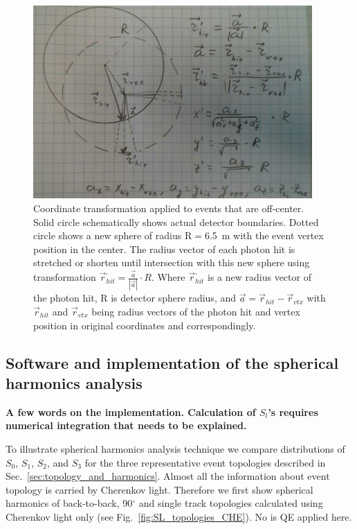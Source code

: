 \documentclass[12pt,twoside,letterpaper]{article}
\begin{document}
\begin{figure}[htb]
\centering
\includegraphics[angle=0,width=0.95\textwidth]{plots/SphH_transform_sketch.JPG}
\caption{Coordinate transformation applied to events that are off-center. Solid circle schematically shows actual detector boundaries. Dotted circle shows a new sphere of radius R$=$6.5~m with the event vertex position in the center. The radius vector of each photon hit is stretched or shorten until intersection with this new sphere using transformation $\vec{r}^{,}_{hit} = \frac{\vec{a}}{|\vec{a}|} \cdot R$. Where $\vec{r}^{,}_{hit}$ is a new radius vector of the photon hit, R is detector sphere radius, and $\vec{a}=\vec{r}_{hit} - \vec{r}_{vtx}$ with $\vec{r}_{hit}$ and $\vec{r}_{vtx}$ being radius vectors of the photon hit and vertex position in original coordinates and correspondingly.}
\label{fig:SphH_transform}
\end{figure}


\subsection{Software and implementation of the spherical harmonics analysis}
{\bf A few words on the implementation. Calculation of $S_l$'s requires numerical integration that needs to be explained.}

To illustrate spherical harmonics analysis technique we compare distributions of $S_0$, $S_1$, $S_2$, and $S_3$ for the three representative event topologies described in Sec.~\ref{sec:topology_and_harmonics}. Almost all the information about event topology is carried by Cherenkov light. Therefore we first show spherical harmonics of back-to-back,  90$^{\circ}$ and single track topologies calculated using Cherenkov light only (see Fig.~\ref{fig:SL_topologies_CHE}). No is QE applied here.
\end{document}
